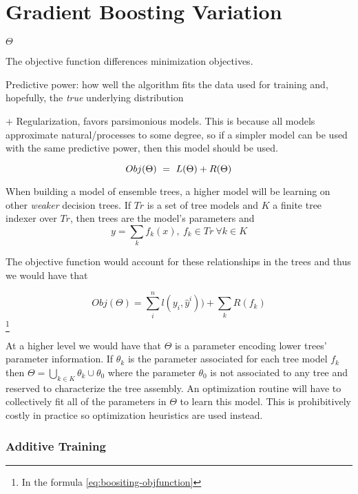 \section{Gradient Boosting Variation}


$\Theta$

The objective function differences minimization objectives. 

Predictive power: how well the algorithm fits the data used for training and, hopefully, the \textit{true} underlying distribution

+ Regularization, favors parsimonious models. This is because all models approximate natural/processes to some degree, so if a simpler model can be used with the same predictive power, then this model should be used.  

\begin{equation} \label{eq:objFunction}
Obj(\Theta) \ = \ L(\Theta) + R(\Theta)
\\
\end{equation}

When building a model of ensemble trees, a higher model will be learning on other \textit{weaker} decision trees. If $Tr$ is a set of tree models and $K$ a finite tree indexer over $Tr$, then trees are the model's parameters and
\[ y = \sum_k f_k(x) , \ f_k \in Tr \ \forall k \in K \]
 
The objective function would account for these relationships in the trees and thus we would have that
 
\[ Obj(\Theta) = \sum_i^n l(y_i,\hat{y}^i))  +  \sum_k R(f_k) \] \label{eq:boositing-objfunction} \footnote{In the formula \ref{eq:boositing-objfunction} }
%    

At a higher level we would have that $\Theta$ is a parameter encoding lower trees' parameter information. If $\theta_k$ is the parameter associated for each tree model $f_k$ then $\Theta =  \bigcup_{k \in K} \theta_k  \cup \theta_0$ where the parameter $\theta_0$ is not associated to any tree and reserved to characterize the tree assembly. An optimization routine will have to collectively fit all of the parameters in $\Theta$ to learn this model. This is prohibitively costly in practice so optimization heuristics are used instead. 

\subsubsection{Additive Training}


